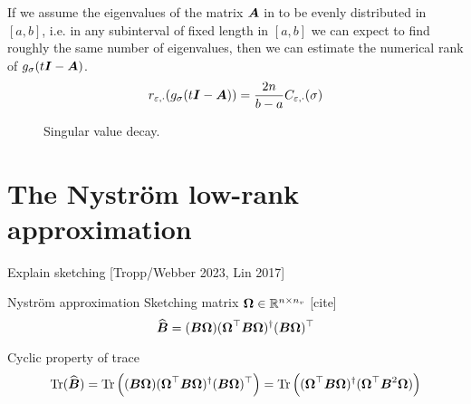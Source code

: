 If we assume the eigenvalues of the matrix $\boldsymbol{A}$ in 
to be evenly distributed in $[a, b]$, i.e. in any subinterval of fixed length in
$[a, b]$ we can expect to find roughly the same number of eigenvalues, then
we can estimate the numerical rank of $g_{\sigma}(t\boldsymbol{I} - \boldsymbol{A})$.
\begin{equation}
    r_{\varepsilon, \cdot}(g_{\sigma}(t\boldsymbol{I} - \boldsymbol{A})) = \frac{2 n}{b - a} C_{\varepsilon, \cdot}(\sigma)
\end{equation}

\begin{figure}[ht]
    \centering
    \caption{Singular value decay. }
    \label{fig:3-nystrom-singular-value-decay}
\end{figure}


\section{The Nystr\"om low-rank approximation}
\label{sec:3-nystrom-nystrom}

Explain sketching [Tropp/Webber 2023, Lin 2017]

Nyström approximation \cite{gittens2013nystrom}
Sketching matrix $\boldsymbol{\Omega} \in \mathbb{R}^{n \times n_v}$ [cite]
\begin{equation}
    \widehat{\boldsymbol{B}} = (\boldsymbol{B} \boldsymbol{\Omega}) (\boldsymbol{\Omega}^{\top} \boldsymbol{B} \boldsymbol{\Omega})^{\dagger} (\boldsymbol{B} \boldsymbol{\Omega})^{\top}
    \label{equ:3-nystrom-SS-nystrom}
\end{equation}

Cyclic property of trace
\begin{equation}
    \operatorname{Tr}(\widehat{\boldsymbol{B}})
        = \operatorname{Tr}\left((\boldsymbol{B} \boldsymbol{\Omega}) (\boldsymbol{\Omega}^{\top} \boldsymbol{B} \boldsymbol{\Omega})^{\dagger} (\boldsymbol{B} \boldsymbol{\Omega})^{\top} \right)
        = \operatorname{Tr}\left((\boldsymbol{\Omega}^{\top} \boldsymbol{B} \boldsymbol{\Omega})^{\dagger} (\boldsymbol{\Omega}^{\top} \boldsymbol{B}^2 \boldsymbol{\Omega}) \right)
    \label{equ:3-nystrom-SS-nystrom-trace}
\end{equation}

